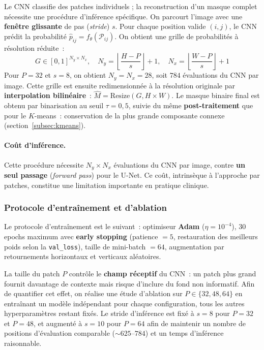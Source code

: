 \documentclass[12pt,a4paper]{article}
\begin{document}
Le CNN classifie des patches individuels ; la reconstruction d'un masque complet nécessite une procédure d'inférence spécifique. On parcourt l'image avec une \textbf{fenêtre glissante} de pas (\emph{stride}) $s$. Pour chaque position valide $(i, j)$, le CNN prédit la probabilité $\hat{p}_{ij} = f_\theta(\mathcal{P}_{ij})$. On obtient une grille de probabilités à résolution réduite~:
\begin{equation}
    G \in [0, 1]^{N_y \times N_x}, \quad N_y = \left\lfloor\frac{H - P}{s}\right\rfloor + 1, \quad N_x = \left\lfloor\frac{W - P}{s}\right\rfloor + 1
    \label{eq:grid}
\end{equation}
Pour $P = 32$ et $s = 8$, on obtient $N_y = N_x = 28$, soit $784$ évaluations du CNN par image. Cette grille est ensuite redimensionnée à la résolution originale par \textbf{interpolation bilinéaire}~: $\hat{M} = \text{Resize}(G, H \times W)$. Le masque binaire final est obtenu par binarisation au seuil $\tau = 0{,}5$, suivie du même \textbf{post-traitement} que pour le $K$-means~: conservation de la plus grande composante connexe (section~\ref{subsec:kmeans}).

\paragraph{Coût d'inférence.} Cette procédure nécessite $N_y \times N_x$ évaluations du CNN par image, contre \textbf{un seul passage} (\emph{forward pass}) pour le U-Net. Ce coût, intrinsèque à l'approche par patches, constitue une limitation importante en pratique clinique.

\subsubsection{Protocole d'entraînement et d'ablation}
\label{subsubsec:protocole_cnn_patch}

Le protocole d'entraînement est le suivant~: optimiseur \textbf{Adam} ($\eta = 10^{-4}$), 30 epochs maximum avec \textbf{early stopping} (patience $= 5$, restauration des meilleurs poids selon la \texttt{val\_loss}), taille de mini-batch $= 64$, augmentation par retournements horizontaux et verticaux aléatoires.

La taille du patch $P$ contrôle le \textbf{champ réceptif} du CNN~: un patch plus grand fournit davantage de contexte mais risque d'inclure du fond non informatif. Afin de quantifier cet effet, on réalise une étude d'ablation sur $P \in \{32, 48, 64\}$ en entraînant un modèle indépendant pour chaque configuration, tous les autres hyperparamètres restant fixés. Le stride d'inférence est fixé à $s = 8$ pour $P = 32$ et $P = 48$, et augmenté à $s = 10$ pour $P = 64$ afin de maintenir un nombre de positions d'évaluation comparable ($\sim 625$--$784$) et un temps d'inférence raisonnable.
\end{document}
